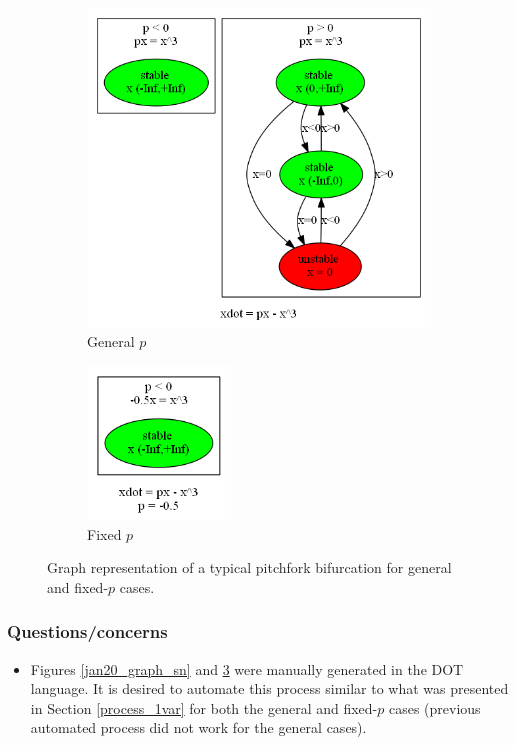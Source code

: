 \documentclass[12pt]{article}
\begin{document}
\begin{figure}[H]
\centering
\begin{subfigure}[b]{0.4\textwidth}
	\centering
	\includegraphics[width=3.75in]{jan20_graph_pf1.png}
	\caption{General $p$}
	\label{jan20_graph_pf1}
\end{subfigure}
\qquad \qquad
\begin{subfigure}[b]{0.4\textwidth}
	\centering
	\includegraphics[width=1.5in]{jan20_graph_pf2.png}
	\caption{Fixed $p$}
	\label{jan20_graph_pf2}
\end{subfigure}
\caption{Graph representation of a typical pitchfork bifurcation for general and fixed-$p$ cases.}
\label{jan20_graph_pf}
\end{figure}

\subsubsection{Questions/concerns}
\begin{itemize}
\item Figures \ref{jan20_graph_sn} and \ref{jan20_graph_pf} were manually generated in the DOT language. It is desired to automate this process similar to what was presented in Section \ref{process_1var} for both the general and fixed-$p$ cases (previous automated process did not work for the general cases).
\end{itemize}
\end{document}
